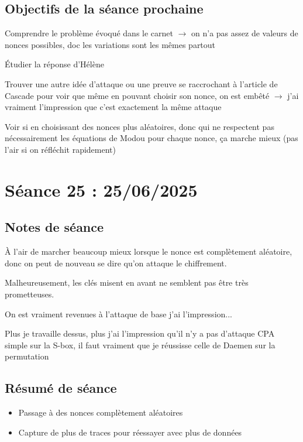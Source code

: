\documentclass[12pt]{article}
\newcommand{\cmark}{\ding{51}}%
\newcommand{\done}{\rlap{$\square$}{\raisebox{2pt}{\large\hspace{1pt}\cmark}}%
	\hspace{-2.5pt}}
\begin{document}
	\subsection{Objectifs de la séance prochaine}
	\begin{todolist}
		\item[\done] Comprendre le problème évoqué dans le carnet $\rightarrow$ on n'a pas assez de valeurs de nonces possibles, doc les variations sont les mêmes partout
		\item[\done] \'Etudier la réponse d'Hélène 
		\item[\done] Trouver une autre idée d'attaque ou une preuve se raccrochant à l'article de Cascade pour voir que même en pouvant choisir son nonce, on est embêté $\rightarrow$ j'ai vraiment l'impression que c'est exactement la même attaque
		\item[\done] Voir si en choisissant des nonces plus aléatoires, donc qui ne respectent pas nécessairement les équations de Modou pour chaque nonce, ça marche mieux (pas l'air si on réfléchit rapidement)
	\end{todolist}
	
	
	\section{Séance 25 : 25/06/2025}
	\subsection{Notes de séance}
	À l'air de marcher beaucoup mieux lorsque le nonce est complètement aléatoire, donc on peut de nouveau se dire qu'on attaque le chiffrement.
	
	\noindent Malheureusement, les clés misent en avant ne semblent pas être très prometteuses.
	
	\noindent On est vraiment revenues à l'attaque de base j'ai l'impression...
	
	\noindent Plus je travaille dessus, plus j'ai l'impression qu'il n'y a pas d'attaque CPA simple sur la S-box, il faut vraiment que je réussisse celle de Daemen sur la permutation
	
	\subsection{Résumé de séance}
	\begin{itemize}
		\item Passage à des nonces complètement aléatoires
		\item Capture de plus de traces pour réessayer avec plus de données
	\end{itemize}
	
\end{document}
